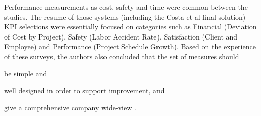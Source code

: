 Performance measurements as cost, safety and time were common between the studies. The resume of those systems (including the Costa et al final solution) KPI selections were essentially focused on categories such as Financial (Deviation of Cost by Project), Safety (Labor Accident Rate), Satisfaction (Client and Employee) and Performance (Project Schedule Growth).
Based on the experience of these surveys, the authors also concluded that the set of measures should 
\begin{enumerate*}[label=\roman{enumi})]
	\item be simple and 
	\item well designed in order to support improvement, and 
	\item give a comprehensive company wide-view \cite{Costa2004}. 
\end{enumerate*} 
